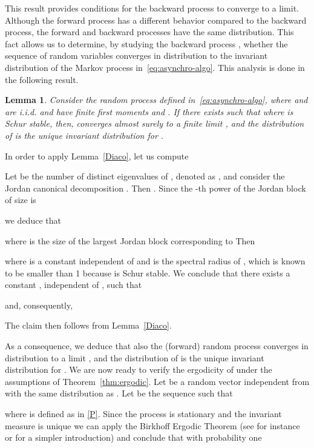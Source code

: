 \documentclass{IEEEtran}
\newtheorem{lemma}{Lemma}
\newcommand{\1}{\mathbf{1}} \newcommand{\ind}{\mathds{1}}
\begin{document}
This result provides conditions for the backward process to converge to a limit. Although the forward process has a different behavior compared to the backward process, the forward and backward processes have the same distribution. This fact allows us to determine, by studying the backward process , whether the sequence of random variables  converges in distribution to the invariant distribution of the Markov { {process}} in~\eqref{eq:asynchro-algo}.
This analysis is done in the following result.
\begin{lemma}\label{lem:back_convergence}
Consider the random process  defined in~\eqref{eq:asynchro-algo}, where  and  are i.i.d. and have finite first moments  and . If there exists  such that 
 where  is Schur stable, then, 
 converges almost surely to a finite limit , and the distribution of  is the unique invariant distribution for .
\end{lemma}
\begin{IEEEproof}
In order to apply Lemma~\ref{Diaco}, let us compute

Let  be the number of distinct eigenvalues of , denoted as 
, and consider the Jordan canonical decomposition . Then . 
Since the -th power of the Jordan block of size  is 

we deduce that 

where  is the size of the largest  Jordan block corresponding to 
Then

where  is a constant independent of  and  is the spectral radius of , which is known to be smaller than 1 because  is Schur stable.
We conclude that there exists a constant , independent of , such that 

and, consequently,

The claim then follows from Lemma~\ref{Diaco}.
\end{IEEEproof}

As a consequence, we deduce that also the (forward) random process  converges in distribution to a limit , and the distribution of  is the unique invariant distribution for .
We are now ready to verify the ergodicity of  under the assumptions of Theorem~\ref{thm:ergodic}.
Let  be a random vector independent from  with the same distribution as . Let  be the sequence such that

where  is defined as in \eqref{P}.
Since the process  is stationary and the invariant measure is unique we can apply the Birkhoff Ergodic Theorem (see for instance~\cite[Chapter~6]{DS:1993} or \cite[Chapter~5]{MH:06} for a simpler introduction) and conclude that with probability one
\end{document}

